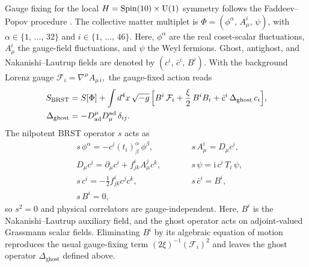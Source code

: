 \documentclass[pdflatex,sn-mathphys-num]{sn-jnl}
\theoremstyle{thmstyleone}
\theoremstyle{thmstylethree}%
\theoremstyle{thmstyletwo}%
\begin{document}
\begin{appendices}
Gauge fixing for the local \(H=\operatorname{Spin}(10) \times \mathrm{U(1)}\) symmetry follows the
Faddeev--Popov procedure \cite{FP67}.  The collective matter multiplet is
\(
  \Phi=(\phi^{\alpha},\,A_{\mu}^{i},\,\psi)
\),
with
\(
  \alpha\in \{1,\,\dots,\,32\}
\)
and
\(
  i\in\{1,\,\dots,\,46\}
\).
Here, \(\phi^{\alpha}\) are the real coset-scalar fluctuations,
\(A_{\mu}^{i}\) the gauge-field fluctuations, and \(\psi\) the Weyl
fermions.  Ghost, antighost, and Nakanishi--Lautrup fields are denoted by
\(
  (c^{i},\,\bar c^{i},\,B^{i})
\).
With the background Lorenz gauge
\(
  \mathcal F_{i}=\nabla^{\mu}A_{\mu\,i},
\)
the gauge-fixed action reads
\begin{equation}\label{eq:BRSTaction}
\begin{aligned}
  S_{\text{BRST}}
  &= S[\Phi]
     +\int d^{4}x\,\sqrt{-g}\,\Bigl[
        B^{i}\,\mathcal F_{i}
        +\frac{\xi}{2}\,B^{i}B_{i}
        +\bar c^{i}\,\Delta_{\text{ghost}}\,c_{i}\Bigr],\\
  \Delta_{\text{ghost}}
  &= -D_{\mathrm{ad}}^{\mu}D_{\mu}^{\mathrm{ad}}\,\delta_{ij}.
\end{aligned}
\end{equation}
The nilpotent BRST operator \(s\) acts as
\[
\begin{aligned}
  &s\,\phi^{\alpha}= -c^{i}(t_{i})^{\alpha}_{\beta}\,\phi^{\beta},\qquad
  &&s\,A_{\mu}^{i}= D_{\mu}c^{i},\\
    &D_{\mu}c^{i}= \partial_{\mu}c^{i}+f^{i}_{jk}A_{\mu}^{j}c^{k},\qquad
  &&s\,\psi= \mathrm i\,c^{i}\,T_{i}\,\psi,\\
  &s\,c^{i}= -\frac12 f^{i}_{jk}c^{j}c^{k},\qquad
  &&s\,\bar c^{i}= B^{i},\\
  &s\,B^{i}=0,
\end{aligned}
\]
so \(s^{2}=0\) and physical correlators are gauge-independent. Here,
\(B^{i}\) is the Nakanishi--Lautrup auxiliary field, and the ghost operator
acts on adjoint-valued Grassmann scalar fields. Eliminating
\(B^{i}\) by its algebraic
equation of motion reproduces the usual gauge-fixing term
\(
  (2\xi)^{-1}(\mathcal F_{i})^{2}
\)
and leaves the ghost operator \(\Delta_{\text{ghost}}\) defined above.


\end{appendices}
\end{document}
